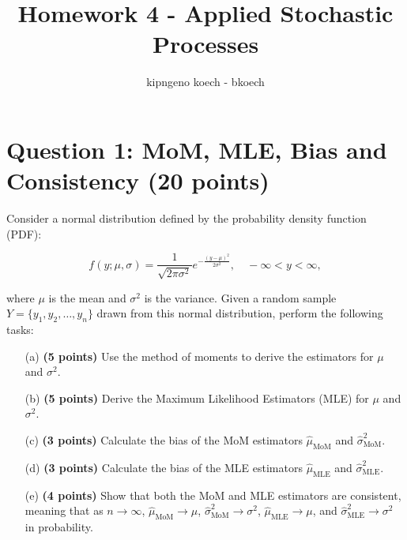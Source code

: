 \documentclass{article}
\begin{document}
\author{kipngeno koech - bkoech}
\title{Homework 4 - Applied Stochastic Processes}   
\maketitle

\medskip

\section*{Question 1: MoM, MLE, Bias and Consistency (20 points)}

Consider a normal distribution defined by the probability density function (PDF):

\[
f(y; \mu, \sigma) = \frac{1}{\sqrt{2\pi\sigma^2}} e^{-\frac{(y - \mu)^2}{2\sigma^2}}, \quad -\infty < y < \infty,
\]

\noindent where \(\mu\) is the mean and \(\sigma^2\) is the variance. Given a random sample \(Y = \{ y_1, y_2, \ldots, y_n \}\) drawn from this normal distribution, perform the following tasks:

\begin{enumerate}
    \item[(a)] \textbf{(5 points)} Use the method of moments to derive the estimators for \(\mu\) and \(\sigma^2\).

     \item[(b)] \textbf{(5 points)} Derive the Maximum Likelihood Estimators (MLE) for \(\mu\) and \(\sigma^2\).

     \item[(c)] \textbf{(3 points)} Calculate the bias of the MoM estimators \(\hat{\mu}_{\text{MoM}}\) and \(\hat{\sigma}^2_{\text{MoM}}\).
     
    \item[(d)] \textbf{(3 points)} Calculate the bias of the MLE estimators \(\hat{\mu}_{\text{MLE}}\) and \(\hat{\sigma}^2_{\text{MLE}}\).

    \item[(e)] \textbf{(4 points)} Show that both the MoM and MLE estimators are consistent, meaning that as \(n \to \infty\), \(\hat{\mu}_{\text{MoM}} \to \mu\), \(\hat{\sigma}^2_{\text{MoM}} \to \sigma^2\), \(\hat{\mu}_{\text{MLE}} \to \mu\), and \(\hat{\sigma}^2_{\text{MLE}} \to \sigma^2\) in probability.
\end{enumerate}
    
  
\end{document}
